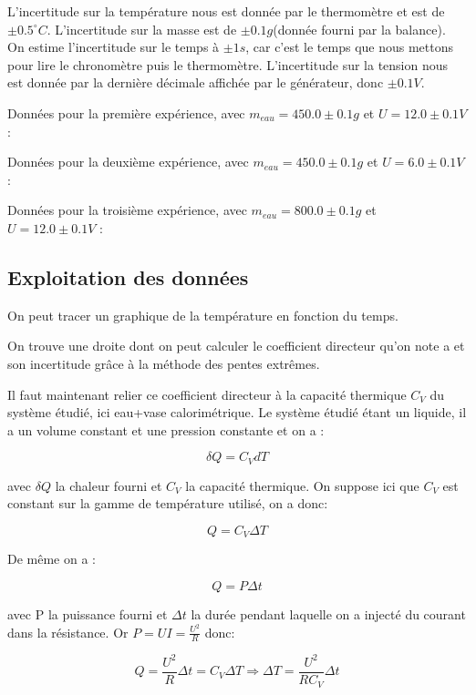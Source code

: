 \documentclass[12pt]{article}
\begin{document}
L'incertitude sur la température nous est donnée par le thermomètre et est de $\pm 0.5^\circ C$. L'incertitude sur la masse est de $\pm 0.1g$(donnée fourni par la balance). On estime l'incertitude sur le temps à $\pm 1s$, car c'est le temps que nous mettons pour lire le chronomètre puis le thermomètre. L'incertitude sur la tension nous est donnée par la dernière décimale affichée par le générateur, donc $\pm 0.1V$.

	Données pour la première expérience, avec $m_{eau}=450.0\pm 0.1g$ et $U=12.0\pm 0.1V$ :


	Données pour la deuxième expérience, avec $m_{eau}=450.0\pm 0.1g$ et $U=6.0\pm 0.1V$ :
	
	
	Données pour la troisième expérience, avec $m_{eau}=800.0\pm 0.1g$ et $U=12.0\pm 0.1V$ :

\subsection{Exploitation des données}

On peut tracer un graphique de la température en fonction du temps.

On trouve une droite dont on peut calculer le coefficient directeur qu'on note a et son incertitude grâce à la méthode des pentes extrêmes.

Il faut maintenant relier ce coefficient directeur à la capacité thermique $C_V$ du système étudié, ici {eau+vase calorimétrique}.
Le système étudié étant un liquide, il a un volume constant et une pression constante et on a :

\begin{equation}
\delta Q=C_VdT
\end{equation}

avec $\delta Q$ la chaleur fourni et $C_V$ la capacité thermique. On suppose ici que $C_V$ est constant sur la gamme de température utilisé, on a donc:

\begin{equation}
Q=C_V\Delta T
\end{equation}

De même on a :

\begin{equation}
Q=P\Delta t
\end{equation}

avec P la puissance fourni et $\Delta t$ la durée pendant laquelle on a injecté du courant dans la résistance. Or $P=UI=\frac{U^2}{R}$ donc:

	\begin{equation}
Q=\frac{U^2}{R}\Delta t = C_V \Delta T 
\Rightarrow \Delta T =\frac{U^2}{RC_V}\Delta t
	\end{equation}
\end{document}

